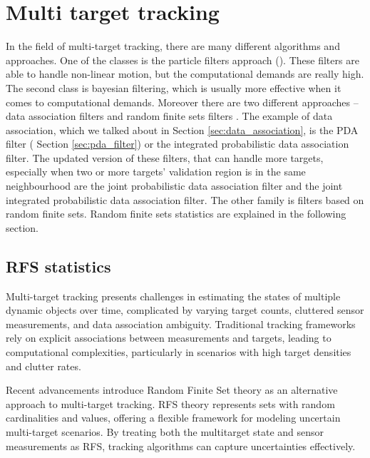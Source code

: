 \section{Multi target tracking}
In the field of multi-target tracking, there are many different algorithms and approaches. One of the classes is the
particle filters approach (\cite{Particle_Khan2005, Particle_Gustafsson2002, Particle_Doucet2001,
    nonlinearParticleFilter}). These filters are able to handle non-linear motion, but the computational demands are
really high. The second class is bayesian filtering, which is usually more effective when it comes to computational
demands. Moreover there are two different approaches -- data association filters and random finite sets filters
. The example of data association, which we talked about in Section \ref{sec:data_association}, is the PDA filter (
Section \ref{sec:pda_filter}) or the integrated probabilistic data association filter. The updated version of these
filters, that can handle more targets, especially when two or more targets' validation region is in the same neighbourhood are the joint probabilistic data association filter and the joint integrated probabilistic data association filter. The other family is filters based on random finite sets. Random finite sets statistics are explained in the following section.
    \subsection{RFS statistics}
Multi-target tracking presents challenges in estimating the states of multiple dynamic objects over time, complicated
by varying target counts, cluttered sensor measurements, and data association ambiguity. Traditional tracking
frameworks rely on explicit associations between measurements and targets, leading to computational complexities, particularly in scenarios with high target densities and clutter rates.

Recent advancements introduce Random Finite Set theory as an alternative approach to multi-target tracking. RFS
theory represents sets with random cardinalities and values, offering a flexible framework for modeling uncertain
multi-target scenarios. By treating both the multitarget state and sensor measurements as RFS, tracking algorithms
can capture uncertainties effectively.

